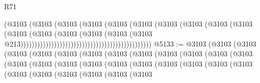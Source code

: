 \begin{lexlean}{R71}
\begin{coremodule}
                                                                  (@3103
                                                                    (@3103
                                                                      (@3103
                                                                        (@3103
                                                                          (@3103
                                                                            (@3103
                                                                              (@3103
                                                                                (@3103
                                                                                  (@3103
                                                                                    (@3103
                                                                                      (@3103
                                                                                        (@3103
                                                                                          (@3103
                                                                                            (@3103
                                                                                              (@3103
                                                                                                (@3103
                                                                                                  @213)))))))))))))))))))))))))))))))))))))))))))))))
@5133 := @3103
    (@3103
      (@3103
        (@3103
          (@3103
            (@3103
              (@3103
                (@3103
                  (@3103
                    (@3103
                      (@3103
                        (@3103
                          (@3103
                            (@3103
                              (@3103
                                (@3103
                                  (@3103
                                    (@3103
                                      (@3103
                                        (@3103
                                          (@3103
                                            (@3103
                                              (@3103
                                                (@3103
                                                  (@3103
                                                    (@3103
                                                      (@3103
                                                        (@3103
                                                          (@3103

\end{coremodule}
\end{lexlean}
